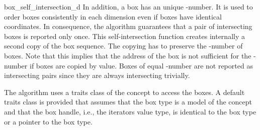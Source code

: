 \begin{ccRefFunction}{box_self_intersection_d}
In addition, a box has an unique -number. It is used to order
boxes consistently in each dimension even if boxes have identical
coordinates. In consequence, the algorithm guarantees that a pair of
intersecting boxes is reported only once.  This self-intersection
function creates internally a second copy of the box sequence. The
copying has to preserve the -number of boxes.  Note that this
implies that the address of the box is not sufficient for the
-number if boxes are copied by value. Boxes of equal
-number are not reported as intersecting pairs since they are
always intersecting trivially.

The algorithm uses a traits class of the 
concept to access the boxes. A default traits class is provided that
assumes that the box type is a model of the 
concept and that the box handle, i.e., the iterators value type, is
identical to the box type or a pointer to the box type.


 


\ccRequirements


\end{ccRefFunction}

